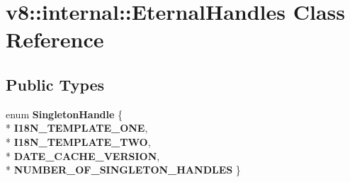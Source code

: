 \hypertarget{classv8_1_1internal_1_1_eternal_handles}{}\section{v8\+:\+:internal\+:\+:Eternal\+Handles Class Reference}
\label{classv8_1_1internal_1_1_eternal_handles}
\subsection*{Public Types}
\begin{DoxyCompactItemize}
\item 
enum {\bfseries Singleton\+Handle} \{ \\*
{\bfseries I18\+N\+\_\+\+T\+E\+M\+P\+L\+A\+T\+E\+\_\+\+O\+NE}, 
\\*
{\bfseries I18\+N\+\_\+\+T\+E\+M\+P\+L\+A\+T\+E\+\_\+\+T\+WO}, 
\\*
{\bfseries D\+A\+T\+E\+\_\+\+C\+A\+C\+H\+E\+\_\+\+V\+E\+R\+S\+I\+ON}, 
\\*
{\bfseries N\+U\+M\+B\+E\+R\+\_\+\+O\+F\+\_\+\+S\+I\+N\+G\+L\+E\+T\+O\+N\+\_\+\+H\+A\+N\+D\+L\+ES}
 \}\hypertarget{classv8_1_1internal_1_1_eternal_handles_acbe0f0927e10f28f93e1eceeb84bc66d}{}\label{classv8_1_1internal_1_1_eternal_handles_acbe0f0927e10f28f93e1eceeb84bc66d}

\end{DoxyCompactItemize}
